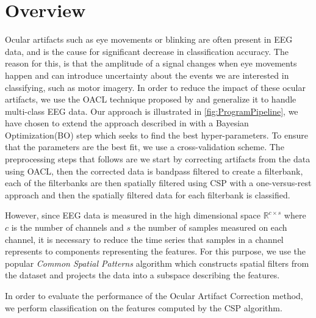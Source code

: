 \section{Overview}
Ocular artifacts such as eye movements or blinking are often present in EEG data, and is the cause for significant decrease in classification accuracy. The reason for this, is that the amplitude of a signal changes when eye movements happen and can introduce uncertainty about the events we are interested in classifying, such as motor imagery. In order to reduce the impact of these ocular artifacts, we use the OACL technique proposed by \citet{li2015ocular} and generalize it to handle multi-class EEG data. Our approach is illustrated in \cref{fig:ProgramPipeline}, we have chosen to extend the approach described in \citet{li2015ocular} with a Bayesian Optimization(BO) step which seeks to find the best hyper-parameters. To ensure that the parameters are the best fit, we use a cross-validation scheme. The preprocessing steps that follows are we start by correcting artifacts from the data using OACL, then the corrected data is bandpass filtered to create a filterbank, each of the filterbanks are then spatially filtered using CSP with a one-versus-rest approach and then the spatially filtered data for each filterbank is classified.

However, since EEG data is measured in the high dimensional space $\mathbb{R}^{c \times s}$ where $c$ is the number of channels and $s$ the number of samples measured on each channel, it is necessary to reduce the time series that samples in a channel represents to components representing the features. For this purpose, we use the popular \emph{Common Spatial Patterns} algorithm which constructs spatial filters from the dataset and projects the data into a subspace describing the features.

In order to evaluate the performance of the Ocular Artifact Correction method, we perform classification on the features computed by the CSP algorithm.
